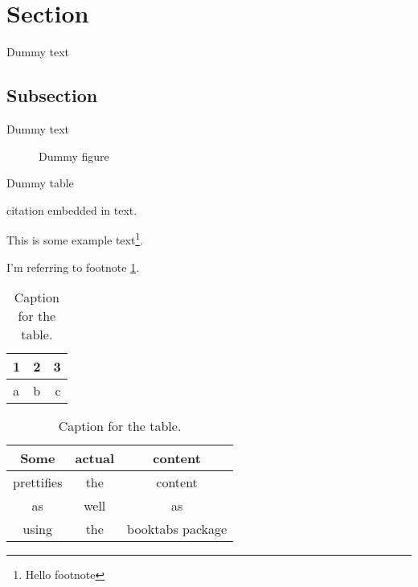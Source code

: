 \documentclass{article}
\begin{document}
\section{Section}
Dummy text
\subsection{Subsection}
Dummy text

\begin{figure}
	\caption{Dummy figure}
\end{figure}

\begin{table}
	\caption{Dummy table}
\end{table}

citation \cite{DUMMY:1} embedded in text.

This is some example text\footnote{\label{myfootnote}Hello footnote}.

I'm referring to footnote \ref{myfootnote}.

\begin{table}[h!]
  \centering
  \label{tab:table1}
  \begin{tabular}{l|c||r}
    1 & 2 & 3\\
    \hline
    a & b & c\\
  \end{tabular}
  \caption{Caption for the table.}
\end{table}


\begin{table}[h!]
  \centering
  \caption{Caption for the table.}
  \label{tab:table1}
  \begin{tabular}{ccc}
    \toprule
    Some & actual & content\\
    \midrule
    prettifies & the & content\\
    as & well & as\\
    using & the & booktabs package\\
    \bottomrule
  \end{tabular}
\end{table}

\begin{appendix}
	\listoffigures
	\listoftables
\end{appendix}

\newpage
 

\end{document}
